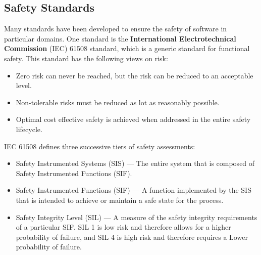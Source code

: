 \documentclass{article}
\begin{document}
\subsection{Safety Standards}
Many standards have been developed to ensure the safety of software in
particular domains. One standard is the \textbf{International
Electrotechnical Commission} (IEC) 61508 standard, which is a generic
standard for functional safety. This standard has the following views
on risk:
\begin{itemize}
    \item Zero risk can never be reached, but the risk can be reduced
          to an acceptable level.
    \item Non-tolerable risks must be reduced as lot as reasonably
          possible.
    \item Optimal cost effective safety is achieved when addressed in
          the entire safety lifecycle.
\end{itemize}
IEC 61508 defines three successive tiers of safety assessments:
\begin{itemize}
    \item Safety Instrumented Systems (SIS) --- The entire system that
          is composed of Safety Instrumented Functions (SIF).
    \item Safety Instrumented Functions (SIF) --- A function
          implemented by the SIS that is intended to achieve or
          maintain a safe state for the process.
    \item Safety Integrity Level (SIL) --- A measure of the safety
          integrity requirements of a particular SIF. SIL 1 is low risk
          and therefore allows for a higher probability of failure, and
          SIL 4 is high risk and therefore requires a Lower probability
          of failure.
\end{itemize}
\end{document}
